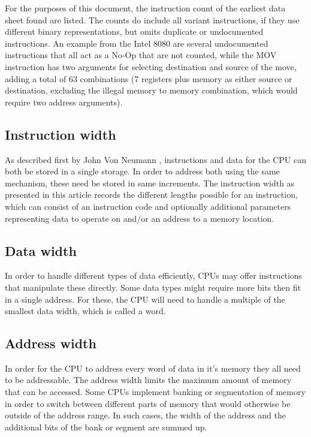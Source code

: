 \documentclass[twoside,twocolumn]{article}
\begin{document}
For the purposes of this document, the instruction count of the earliest data sheet found
are listed. The counts do include all variant instructions, if they use different binary
representations, but omits duplicate or undocumented instructions. An example from the
Intel 8080 are several undocumented instructions that all act as a No-Op that are not
counted, while the MOV instruction has two arguments for selecting destination and source
of the move, adding a total of 63 combinations (7 registers plus memory as either source
or destination, excluding the illegal memory to memory combination, which would require
two address arguments).

\subsection{Instruction width}

As described first by John Von Neumann \cite{edvac}, instructions and data for the CPU
can both be stored in a single storage. In order to address both using the same
mechanism, these need be stored in same increments. The instruction width as presented
in this article records the different lengths possible for an instruction, which can
consist of an instruction code and optionally additional parameters representing data to
operate on and/or an address to a memory location.

\subsection{Data width}

In order to handle different types of data efficiently, CPUs may offer instructions that
manipulate these directly. Some data types might require more bits then fit in a single
address. For these, the CPU will need to handle a multiple of the smallest data width,
which is called a word.

\subsection{Address width}

In order for the CPU to address every word of data in it's memory they all need to be
addressable. The address width limits the maximum amount of memory that can be accessed.
Some CPUs implement banking or segmentation of memory in order to switch between
different parts of memory that would otherwise be outside of the address range. In such
cases, the width of the address and the additional bits of the bank or segment are
summed up.
\end{document}
